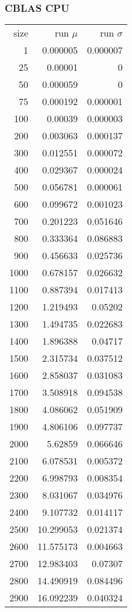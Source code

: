 \subsubsection{CBLAS CPU}

\begin{tabular}{r r r}
size & run $\mu$ & run $\sigma$ \\
1 & 0.000005 & 0.000007 \\
25 & 0.00001 & 0 \\
50 & 0.000059 & 0 \\
75 & 0.000192 & 0.000001 \\
100 & 0.00039 & 0.000003 \\
200 & 0.003063 & 0.000137 \\
300 & 0.012551 & 0.000072 \\
400 & 0.029367 & 0.000024 \\
500 & 0.056781 & 0.000061 \\
600 & 0.099672 & 0.001023 \\
700 & 0.201223 & 0.051646 \\
800 & 0.333364 & 0.086883 \\
900 & 0.456633 & 0.025736 \\
1000 & 0.678157 & 0.026632 \\
1100 & 0.887394 & 0.017413 \\
1200 & 1.219493 & 0.05202 \\
1300 & 1.494735 & 0.022683 \\
1400 & 1.896388 & 0.04717 \\
1500 & 2.315734 & 0.037512 \\
1600 & 2.858037 & 0.031083 \\
1700 & 3.508918 & 0.094538 \\
1800 & 4.086062 & 0.051909 \\
1900 & 4.806106 & 0.097737 \\
2000 & 5.62859 & 0.066646 \\
2100 & 6.078531 & 0.005372 \\
2200 & 6.998793 & 0.008354 \\
2300 & 8.031067 & 0.034976 \\
2400 & 9.107732 & 0.014117 \\
2500 & 10.299053 & 0.021374 \\
2600 & 11.575173 & 0.004663 \\
2700 & 12.983403 & 0.07307 \\
2800 & 14.490919 & 0.084496 \\
2900 & 16.092239 & 0.040324 \\

\end{tabular}
